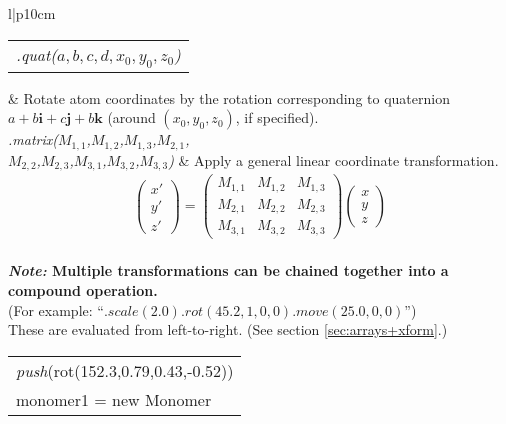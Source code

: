 \documentclass[11pt]{article}
\begin{document}
\begin{longtable}[h]{l|p{10cm}}
\begin{tabular}[t]{l}
  \textit{.quat($a,b,c,d,x_0,y_0,z_0$)} \\
\end{tabular}
  &
 Rotate atom coordinates by the rotation corresponding
 to quaternion $a+b\mathbf{i}+c\mathbf{j}+b\mathbf{k}$
 (around \mbox{$(x_0,y_0,z_0)$}, if specified).
\\
\hline
\textit{.matrix($M_{1,1}$,$M_{1,2}$,$M_{1,3}$,$M_{2,1}$,}\\
\textit{$M_{2,2}$,$M_{2,3}$,$M_{3,1}$,$M_{3,2}$,$M_{3,3}$)}
&
Apply a general linear coordinate transformation.
\begin{eqnarray*}
\left(\begin{array}{c}
       x' \\
       y' \\
       z'
\end{array}\right)
=
\left(\begin{array}{ccc}
       M_{1,1} & M_{1,2} & M_{1,3} \\
       M_{2,1} & M_{2,2} & M_{2,3} \\
       M_{3,1} & M_{3,2} & M_{3,3}
\end{array}\right)
\left(\begin{array}{c}
       x \\
       y \\
       z
\end{array}\right)
\end{eqnarray*}
\\
\hline
{} {
\textbf{
\textit{Note:}
Multiple transformations can be chained together into a compound operation.}
}
\\
 {
(For example: \mbox{``$.scale(2.0).rot(45.2,1,0,0).move(25.0,0,0)$''})
}
\\
 {
These are evaluated from left-to-right.
(See section \ref{sec:arrays+xform}.)
}
\\
\hline
\begin{tabular}[t]{l}
  \\
\textit{push}(rot(152.3,0.79,0.43,-0.52))  \\
monomer1 = new Monomer \\

\end{tabular}
\end{longtable}
\end{document}
